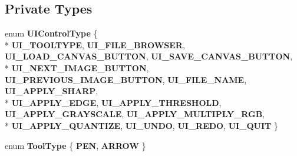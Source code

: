 \subsection*{Private Types}
\begin{DoxyCompactItemize}
\item 
enum {\bfseries U\-I\-Control\-Type} \{ \\*
{\bfseries U\-I\-\_\-\-T\-O\-O\-L\-T\-Y\-P\-E}, 
{\bfseries U\-I\-\_\-\-F\-I\-L\-E\-\_\-\-B\-R\-O\-W\-S\-E\-R}, 
{\bfseries U\-I\-\_\-\-L\-O\-A\-D\-\_\-\-C\-A\-N\-V\-A\-S\-\_\-\-B\-U\-T\-T\-O\-N}, 
{\bfseries U\-I\-\_\-\-S\-A\-V\-E\-\_\-\-C\-A\-N\-V\-A\-S\-\_\-\-B\-U\-T\-T\-O\-N}, 
\\*
{\bfseries U\-I\-\_\-\-N\-E\-X\-T\-\_\-\-I\-M\-A\-G\-E\-\_\-\-B\-U\-T\-T\-O\-N}, 
{\bfseries U\-I\-\_\-\-P\-R\-E\-V\-I\-O\-U\-S\-\_\-\-I\-M\-A\-G\-E\-\_\-\-B\-U\-T\-T\-O\-N}, 
{\bfseries U\-I\-\_\-\-F\-I\-L\-E\-\_\-\-N\-A\-M\-E}, 
{\bfseries U\-I\-\_\-\-A\-P\-P\-L\-Y\-\_\-\-S\-H\-A\-R\-P}, 
\\*
{\bfseries U\-I\-\_\-\-A\-P\-P\-L\-Y\-\_\-\-E\-D\-G\-E}, 
{\bfseries U\-I\-\_\-\-A\-P\-P\-L\-Y\-\_\-\-T\-H\-R\-E\-S\-H\-O\-L\-D}, 
{\bfseries U\-I\-\_\-\-A\-P\-P\-L\-Y\-\_\-\-G\-R\-A\-Y\-S\-C\-A\-L\-E}, 
{\bfseries U\-I\-\_\-\-A\-P\-P\-L\-Y\-\_\-\-M\-U\-L\-T\-I\-P\-L\-Y\-\_\-\-R\-G\-B}, 
\\*
{\bfseries U\-I\-\_\-\-A\-P\-P\-L\-Y\-\_\-\-Q\-U\-A\-N\-T\-I\-Z\-E}, 
{\bfseries U\-I\-\_\-\-U\-N\-D\-O}, 
{\bfseries U\-I\-\_\-\-R\-E\-D\-O}, 
{\bfseries U\-I\-\_\-\-Q\-U\-I\-T}
 \}
\item 
enum {\bfseries Tool\-Type} \{ {\bfseries P\-E\-N}, 
{\bfseries A\-R\-R\-O\-W}
 \}
\end{DoxyCompactItemize}
